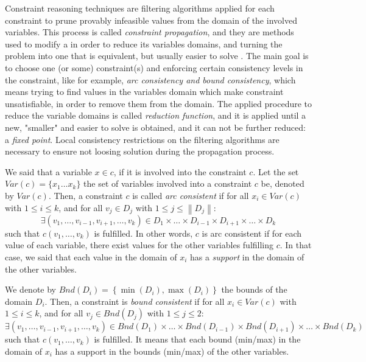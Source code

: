 Constraint reasoning techniques are filtering algorithms applied for each constraint to prune provably infeasible values from the domain of the involved variables. This process is called \textit{constraint propagation}, and they are methods used to modify a \CSP{} in order to reduce its variables domains, and turning the problem into one that is equivalent, but usually easier to solve \cite{ChristianBessiere2006}. The main goal is to choose one (or some) constraint(s) and enforcing certain consistency levels in the constraint, like for example, \textit{arc consistency and bound consistency}, which means trying to find values in the variables domain which make constraint unsatisfiable, in order to remove them from the domain. The applied procedure to reduce the variable domains is called \textit{reduction function}, and it is applied until a new, "smaller" and easier to solve is obtained, and it can not be further reduced: a \textit{fixed point}. Local consistency restrictions on the filtering algorithms are necessary to ensure not loosing solution during the propagation process.

We said that a variable $x \in c$, if it is involved into the constraint $c$. Let the set $Var(c) = \{x_1\dots x_k\}$ the set of variables  involved into a constraint $c$ be, denoted by $Var(c)$. Then, a constraint $c$ is called \textit{arc consistent} if for all $x_i \in Var(c)$ with $1\leq i\leq k$, and for all $v_j \in D_j$ with $1\leq j\leq \left\|D_j\right\|$:
\[
\exists (v_1, \dots, v_{i-1}, v_{i+1},\dots, v_k) \in D_1\times\dots\times D_{i-1}\times D_{i+1}\times\dots\times D_k
\]
such that $c(v_1, \dots, v_k)$ is fulfilled. In other words, $c$ is arc consistent if for each value of each variable, there exist values for the other variables fulfilling $c$. In that case, we said that each value in the domain of $x_i$ has a \textit{support} in the domain of the other variables.

We denote by $Bnd(D_i) = \left\{\min(D_i), \max(D_i)\right\}$ the bounds of the domain $D_i$. Then, a constraint is \textit{bound consistent} if for all $x_i \in Var(c)$ with $1\leq i\leq k$, and for all $v_j \in Bnd(D_j)$ with $1\leq j\leq 2$:
\[
\exists (v_1, \dots, v_{i-1}, v_{i+1},\dots, v_k) \in Bnd\left(D_1\right)\times\dots\times Bnd\left(D_{i-1}\right)\times Bnd\left(D_{i+1}\right)\times\dots\times Bnd\left(D_k\right)
\]
such that $c(v_1, \dots, v_k)$ is fulfilled. It means that each bound (min/max) in the domain of $x_i$ has a support in the bounds (min/max) of the other variables.

